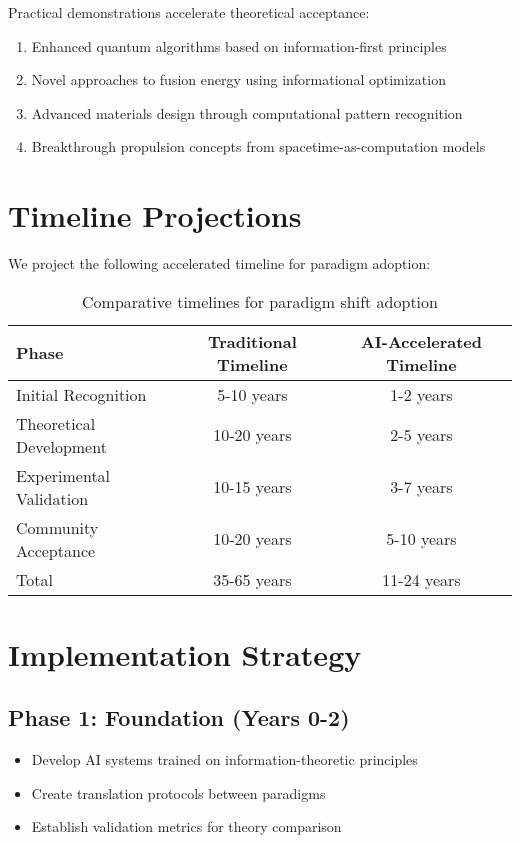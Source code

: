 \documentclass[12pt,preprint]{article}
\begin{document}
Practical demonstrations accelerate theoretical acceptance:

\begin{enumerate}
\item Enhanced quantum algorithms based on information-first principles
\item Novel approaches to fusion energy using informational optimization
\item Advanced materials design through computational pattern recognition
\item Breakthrough propulsion concepts from spacetime-as-computation models
\end{enumerate}

\section{Timeline Projections}

We project the following accelerated timeline for paradigm adoption:

\begin{table}[h]
\centering
\begin{tabular}{|l|c|c|}
\hline
Phase & Traditional Timeline & AI-Accelerated Timeline \\
\hline
Initial Recognition & 5-10 years & 1-2 years \\
Theoretical Development & 10-20 years & 2-5 years \\
Experimental Validation & 10-15 years & 3-7 years \\
Community Acceptance & 10-20 years & 5-10 years \\
\hline
Total & 35-65 years & 11-24 years \\
\hline
\end{tabular}
\caption{Comparative timelines for paradigm shift adoption}
\end{table}

\section{Implementation Strategy}

\subsection{Phase 1: Foundation (Years 0-2)}
\begin{itemize}
\item Develop AI systems trained on information-theoretic principles
\item Create translation protocols between paradigms
\item Establish validation metrics for theory comparison
\end{itemize}
\end{document}
